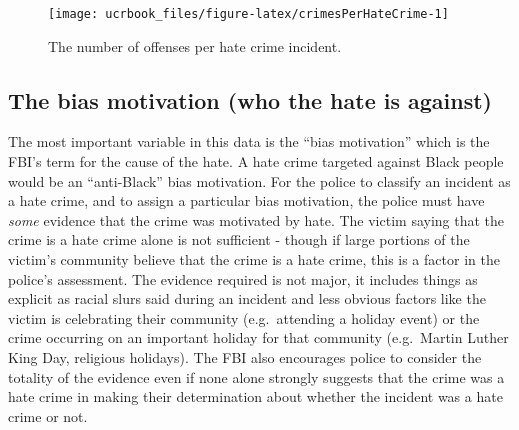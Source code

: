 \documentclass[
  12pt,
  openany]{book}
\begin{document}
\begin{figure}

{\centering \texttt{[image: ucrbook\_files/figure-latex/crimesPerHateCrime-1]} 

}

\caption{The number of offenses per hate crime incident.}\label{fig:crimesPerHateCrime}
\end{figure}

\hypertarget{the-bias-motivation-who-the-hate-is-against}{%
\subsection{The bias motivation (who the hate is against)}\label{the-bias-motivation-who-the-hate-is-against}}

The most important variable in this data is the ``bias motivation'' which is the FBI's term for the cause of the hate. A hate crime targeted against Black people would be an ``anti-Black'' bias motivation. For the police to classify an incident as a hate crime, and to assign a particular bias motivation, the police must have \emph{some} evidence that the crime was motivated by hate. The victim saying that the crime is a hate crime alone is not sufficient - though if large portions of the victim's community believe that the crime is a hate crime, this is a factor in the police's assessment. The evidence required is not major, it includes things as explicit as racial slurs said during an incident and less obvious factors like the victim is celebrating their community (e.g.~attending a holiday event) or the crime occurring on an important holiday for that community (e.g.~Martin Luther King Day, religious holidays). The FBI also encourages police to consider the totality of the evidence even if none alone strongly suggests that the crime was a hate crime in making their determination about whether the incident was a hate crime or not.
\end{document}
